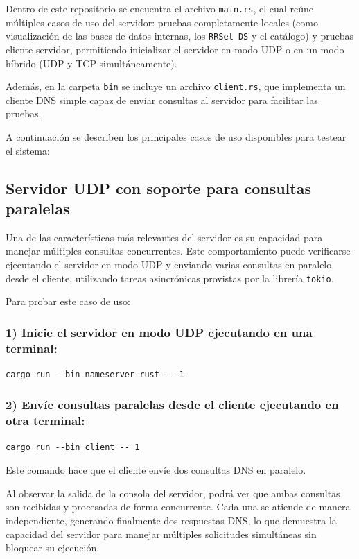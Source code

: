 Dentro de este repositorio se encuentra el archivo \texttt{main.rs}, el cual reúne múltiples casos de uso del servidor: pruebas completamente locales 
(como visualización de las bases de datos internas, los \texttt{RRSet DS} y el catálogo) y pruebas cliente-servidor, permitiendo inicializar el servidor en modo UDP o en un modo híbrido 
(UDP y TCP simultáneamente).

Además, en la carpeta \texttt{bin} se incluye un archivo \texttt{client.rs}, que implementa un cliente DNS simple capaz de enviar consultas al servidor para facilitar las pruebas.

A continuación se describen los principales casos de uso disponibles para testear el sistema:

\subsection{Servidor UDP con soporte para consultas paralelas}

Una de las características más relevantes del servidor es su capacidad para manejar múltiples consultas concurrentes.
Este comportamiento puede verificarse ejecutando el servidor en modo UDP y enviando varias consultas en paralelo desde el cliente, utilizando tareas asincrónicas provistas por la 
librería \texttt{tokio}.

Para probar este caso de uso:

\subsubsection{1) Inicie el servidor en modo UDP ejecutando en una terminal:}

\begin{lstlisting}
cargo run --bin nameserver-rust -- 1
\end{lstlisting}

\subsubsection{2) Envíe consultas paralelas desde el cliente ejecutando en otra terminal:}

\begin{lstlisting}
cargo run --bin client -- 1
\end{lstlisting}

Este comando hace que el cliente envíe dos consultas DNS en paralelo.

Al observar la salida de la consola del servidor, podrá ver que ambas consultas son recibidas y procesadas de forma concurrente. Cada una se atiende de manera independiente, 
generando finalmente dos respuestas DNS, lo que demuestra la capacidad del servidor para manejar múltiples solicitudes simultáneas sin bloquear su ejecución.


